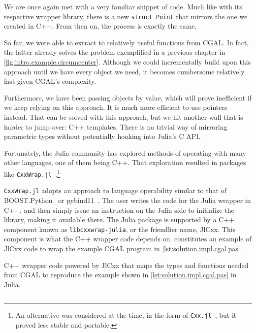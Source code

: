 We are once again met with a very familiar snippet of code.  Much like with its
respective wrapper library, there is a new \texttt{struct Point} that
mirrors the one we created in C++.  From then on, the process is exactly the
same.

So far, we were able to extract to relatively useful functions from \ac{CGAL}.
In fact, the latter already solves the problem exemplified in a previous
chapter in \cref{fig:intro.example.circumcenter}.  Although we could
incrementally build upon this approach until we have every object we need, it
becomes cumbersome relatively fast given \ac{CGAL}'s complexity.

Furthermore, we have been passing objects by value, which will prove inefficient
if we keep relying on this approach.  It is much more efficient to use pointers
instead.  That can be solved with this approach, but we hit another wall that is
harder to jump over: C++ templates.  There is no trivial way of mirroring
parametric types without potentially hooking into Julia's C \ac{API}.%

Fortunately, the Julia community has explored methods of operating with many
other languages, one of them being C++.  That exploration resulted in packages
like \texttt{CxxWrap.jl}~\cite{Janssens:2016:CxxWrap.jl}.\footnote{An
alternative was considered at the time, in the form of
\texttt{Cxx.jl}~\cite{Fischer:2019:Cxx.jl}, but it proved less stable and
portable.}

\texttt{CxxWrap.jl} adopts an approach to language operability similar to that of
BOOST.Python~\cite{Abrahams:2003:BHSBP} or pybind11~\cite{Wenzel:2017:pybind11}.
The user writes the code for the Julia wrapper in C++, and then simply issue an
instruction on the Julia side to initialize the library, making it available
there.  The Julia package is supported by a C++ component known as
\texttt{libcxxwrap-julia}, or the friendlier name, JlCxx. This component is what
the C++ wrapper code depends on.  
constitutes an example of JlCxx code to wrap the example \ac{CGAL} program in
\cref{lst:solution.impl.cgal.pas}.

\begin{listing}[htb]
  \caption[Wrapper CxxWrap code for Three points and one segment]{
    C++ wrapper code powered by JlCxx that maps the types and functions needed
    from \acs{CGAL} to reproduce the example shown in
    \cref{lst:solution.impl.cgal.pas} in Julia.}%
  \label{lst:solution.impl.jlcgal.jlcxx}
  \inputminted[fontsize=\small,highlightlines={24,30-34,36-38,40-43,46-49}]%
    {cpp}{cpp/cgal_julia.cpp}
\end{listing}

